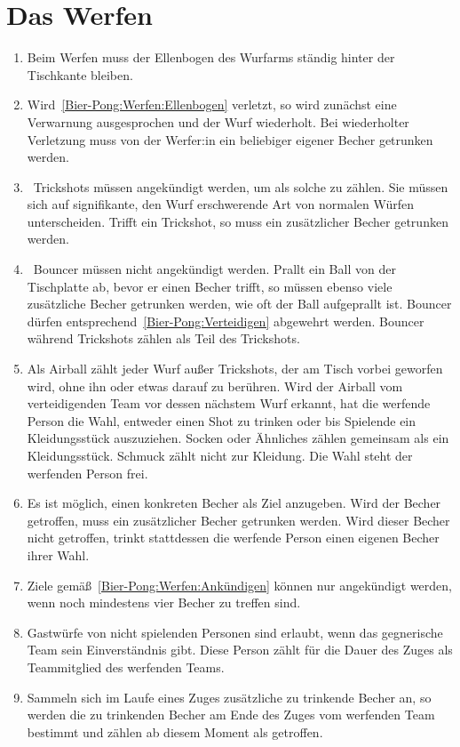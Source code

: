 \section{Das Werfen}
\begin{enumerate}[label={(\arabic*)}]
    \item\label{Bier-Pong:Werfen:Ellenbogen}
    Beim Werfen muss der Ellenbogen des Wurfarms ständig hinter der Tischkante bleiben.

    \item
    Wird~\ref{Bier-Pong:Werfen:Ellenbogen} verletzt, so wird zunächst eine Verwarnung ausgesprochen und der Wurf wiederholt.
    Bei wiederholter Verletzung muss von der Werfer:in ein beliebiger eigener Becher getrunken werden.

    \item
~\glqq{}Trickshots\grqq{} müssen angekündigt werden, um als solche zu zählen.
    Sie müssen sich auf signifikante, den Wurf erschwerende Art von normalen Würfen unterscheiden.
    Trifft ein Trickshot, so muss ein zusätzlicher Becher getrunken werden.

    \item
~\glqq{}Bouncer\grqq{} müssen nicht angekündigt werden.
    Prallt ein Ball von der Tischplatte ab, bevor er einen Becher trifft, so müssen ebenso viele zusätzliche Becher getrunken werden, wie oft der Ball aufgeprallt ist.
    Bouncer dürfen entsprechend~\ref{Bier-Pong:Verteidigen} abgewehrt werden.
    Bouncer während Trickshots zählen als Teil des Trickshots.

    \item
    Als \glqq{}Airball\grqq{} zählt jeder Wurf außer Trickshots, der am Tisch vorbei geworfen wird, ohne ihn oder etwas darauf zu berühren.
    Wird der Airball vom verteidigenden Team vor dessen nächstem Wurf erkannt, hat die werfende Person die Wahl, entweder einen Shot zu trinken oder bis Spielende ein Kleidungsstück auszuziehen.
    Socken oder Ähnliches zählen gemeinsam als ein Kleidungsstück.
    Schmuck zählt nicht zur Kleidung.
    Die Wahl steht der werfenden Person frei.

    \item\label{Bier-Pong:Werfen:Ankündigen}
    Es ist möglich, einen konkreten Becher als Ziel anzugeben.
    Wird der Becher getroffen, muss ein zusätzlicher Becher getrunken werden.
    Wird dieser Becher nicht getroffen, trinkt stattdessen die werfende Person einen eigenen Becher ihrer Wahl.

    \item
    Ziele gemäß~\ref{Bier-Pong:Werfen:Ankündigen} können nur angekündigt werden, wenn noch mindestens vier Becher zu treffen sind.

    \item
    Gastwürfe von nicht spielenden Personen sind erlaubt, wenn das gegnerische Team sein Einverständnis gibt.
    Diese Person zählt für die Dauer des Zuges als Teammitglied des werfenden Teams.

    \item
    Sammeln sich im Laufe eines Zuges zusätzliche zu trinkende Becher an, so werden die zu trinkenden Becher am Ende des Zuges vom werfenden Team bestimmt und zählen ab diesem Moment als getroffen.
\end{enumerate}
